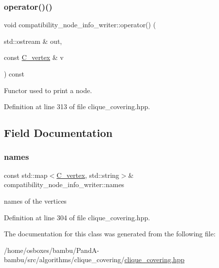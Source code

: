 \subsubsection{\texorpdfstring{operator()()}{operator()()}}
{\footnotesize\ttfamily void compatibility\+\_\+node\+\_\+info\+\_\+writer\+::operator() (\begin{DoxyParamCaption}\item[{std\+::ostream \&}]{out,  }\item[{const \hyperlink{clique__covering__graph_8hpp_a9cb45047ea8c5ed95a8cfa90494345aa}{C\+\_\+vertex} \&}]{v }\end{DoxyParamCaption}) const\hspace{0.3cm}{\ttfamily [inline]}}



Functor used to print a node. 



Definition at line 313 of file clique\+\_\+covering.\+hpp.



\subsection{Field Documentation}
\mbox{\label{classcompatibility__node__info__writer_ace65e19901cc18536b151292dd147a5e}} 
\subsubsection{\texorpdfstring{names}{names}}
{\footnotesize\ttfamily const std\+::map$<$\hyperlink{clique__covering__graph_8hpp_a9cb45047ea8c5ed95a8cfa90494345aa}{C\+\_\+vertex}, std\+::string$>$\& compatibility\+\_\+node\+\_\+info\+\_\+writer\+::names\hspace{0.3cm}{\ttfamily [private]}}



names of the vertices 



Definition at line 304 of file clique\+\_\+covering.\+hpp.



The documentation for this class was generated from the following file\+:\begin{DoxyCompactItemize}
\item 
/home/osboxes/bambu/\+Pand\+A-\/bambu/src/algorithms/clique\+\_\+covering/\hyperlink{clique__covering_8hpp}{clique\+\_\+covering.\+hpp}\end{DoxyCompactItemize}
